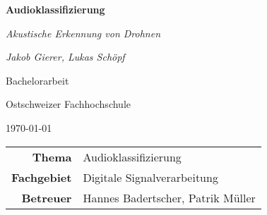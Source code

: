 %
%
%


\begin{titlepage}
    \centering

    {\huge \bfseries \sffamily Audioklassifizierung \par
     \normalfont\itshape Akustische Erkennung von Drohnen \par}
    \vspace{1cm}

    {\large \textsl{Jakob Gierer, Lukas Schöpf}}
    \par
    \vspace{1cm}

    {\textsc Bachelorarbeit \par}
    {Ostschweizer Fachhochschule \par}
    \today
    \vfill
    

    \vfill

    \begin{tabular}{rl}
        \bfseries\sffamily Thema & Audioklassifizierung \\
        \bfseries\sffamily Fachgebiet          & Digitale Signalverarbeitung \\
        \bfseries\sffamily Betreuer       & Hannes Badertscher, Patrik Müller \\
        
    \end{tabular}
    \restoregeometry    
\end{titlepage}

